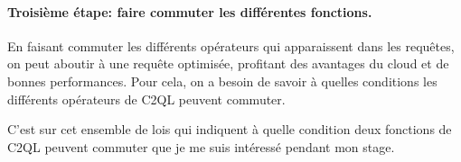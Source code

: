\paragraph{Troisième étape: faire commuter les différentes fonctions.}
En faisant commuter les différents opérateurs qui apparaissent dans les requêtes,
on peut aboutir à une requête optimisée, profitant des avantages du cloud et de bonnes performances.
Pour cela, on a besoin de savoir à quelles conditions les différents opérateurs de C2QL peuvent
commuter.

C'est sur cet ensemble de lois qui indiquent à quelle condition deux fonctions de C2QL peuvent
commuter que je me suis intéressé pendant mon stage.